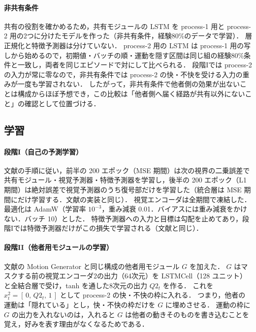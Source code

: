 \paragraph{非共有条件}
共有の役割を確かめるため，共有モジュールの LSTM を process-1 用と process-2 用の2つに分けたモデルを作った（非共有条件，経験80\%のデータで学習）．
層正規化と特徴予測器は分けていない．
process-2 用の LSTM は process-1 用の写しから始めるので，初期値・バッチの順・運動を隠す区間は同じ組の経験80\%条件と一致し，両者を同じエピソードで対にして比べられる．
段階Iでは process-2 の入力が常に零なので，非共有条件では process-2 の快・不快を受ける入力の重みが一度も学習されない．
したがって，非共有条件で他者側の効果が出ないことは構成からほぼ予想でき，この比較は「他者側へ届く経路が共有以外にないこと」の確認として位置づける．

\subsection{学習}\label{sec:training}

\paragraph{段階I（自己の予測学習）}
文献\cite{noguchi2022superposition}の手順に従い，前半の 200 エポック（MSE 期間）は次の視界の二乗誤差で共有モジュール・視覚予測器・特徴予測器を学習し，後半の 200 エポック（L1 期間）は絶対誤差で視覚予測器のうち復号部だけを学習した（統合層は MSE 期間にだけ学習する．文献\cite{noguchi2022superposition}の実装と同じ）．
視覚エンコーダは全期間で凍結した．
最適化は AdamW（学習率 $10^{-3}$，重み減衰 0.01．バイアスには重み減衰をかけない．バッチ 10）とした．
特徴予測器への入力と目標は勾配を止めてあり，段階Iでは特徴予測器だけがこの損失で学習される（文献\cite{noguchi2022superposition}と同じ）．

\paragraph{段階II（他者用モジュールの学習）}
文献\cite{noguchi2022superposition}の Motion Generator と同じ構成の他者用モジュール $G$ を加えた．
$G$ はマスクする前の視覚エンコーダ2の出力（64次元）を LSTMCell（128 ユニット）と全結合層で受け，tanh を通した8次元の出力 $Q2_t$ を作る．
これを $x^2_t = [\,0,\, Q2_t,\, 1\,]$ として process-2 の快・不快の枠に入れる．
つまり，他者の運動は「隠れている」とし，快・不快の枠だけを $G$ に埋めさせる．
運動の枠に $G$ の出力を入れないのは，入れると $G$ は他者の動きそのものを書き込むことを覚え，好みを表す理由がなくなるためである．

